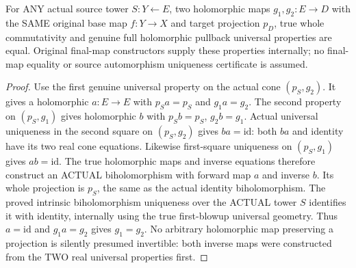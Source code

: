 \begin{theorem}
\label{hir:smooth-terminal-whole-pullback-map-intrinsic-uniqueness}
\leanok
{}
For ANY actual source tower $S:Y\leftarrow E$, two holomorphic maps
$g_1,g_2:E\to D$ with the SAME original base map $f:Y\to X$ and target
projection $p_D$, true whole commutativity and genuine full holomorphic
pullback universal properties are equal. Original final-map constructors
supply these properties internally; no final-map equality or source
automorphism uniqueness certificate is assumed.
\end{theorem}
\begin{proof}
Use the first genuine universal property on the actual cone $(p_S,g_2)$.
It gives a holomorphic $a:E\to E$ with $p_Sa=p_S$ and $g_1a=g_2$.
The second property on $(p_S,g_1)$ gives holomorphic $b$ with
$p_Sb=p_S$, $g_2b=g_1$. Actual universal uniqueness in the second square
on $(p_S,g_2)$ gives $ba=\mathrm{id}$: both $ba$ and identity have its
two real cone equations. Likewise first-square uniqueness on $(p_S,g_1)$
gives $ab=\mathrm{id}$. The true holomorphic maps and inverse equations
therefore construct an ACTUAL biholomorphism with forward map $a$ and
inverse $b$. Its whole projection is $p_S$, the same as the actual
identity biholomorphism. The proved intrinsic biholomorphism uniqueness
over the ACTUAL tower $S$ identifies it with identity, internally using
the true first-blowup universal geometry. Thus $a=\mathrm{id}$ and
$g_1a=g_2$ gives $g_1=g_2$. No arbitrary holomorphic map preserving a
projection is silently presumed invertible: both inverse maps were
constructed from the TWO real universal properties first.
\end{proof}

